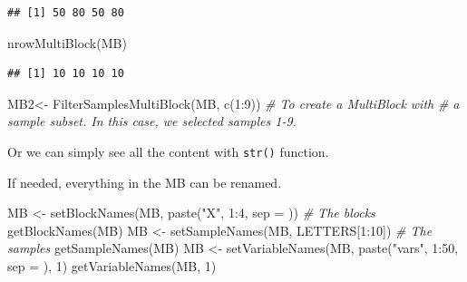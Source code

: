 \documentclass[
]{book}
\newenvironment{Shaded}{\begin{snugshade}}{\end{snugshade}}
\newcommand{\AttributeTok}[1]{\textcolor[rgb]{0.77,0.63,0.00}{#1}}
\newcommand{\CommentTok}[1]{\textcolor[rgb]{0.56,0.35,0.01}{\textit{#1}}}
\newcommand{\DecValTok}[1]{\textcolor[rgb]{0.00,0.00,0.81}{#1}}
\newcommand{\FunctionTok}[1]{\textcolor[rgb]{0.00,0.00,0.00}{#1}}
\newcommand{\NormalTok}[1]{#1}
\newcommand{\OtherTok}[1]{\textcolor[rgb]{0.56,0.35,0.01}{#1}}
\newcommand{\SpecialCharTok}[1]{\textcolor[rgb]{0.00,0.00,0.00}{#1}}
\newcommand{\StringTok}[1]{\textcolor[rgb]{0.31,0.60,0.02}{#1}}
\begin{document}
\begin{verbatim}
## [1] 50 80 50 80
\end{verbatim}

\begin{Shaded}
\begin{Highlighting}[]
\FunctionTok{nrowMultiBlock}\NormalTok{(MB)}
\end{Highlighting}
\end{Shaded}

\begin{verbatim}
## [1] 10 10 10 10
\end{verbatim}

\begin{Shaded}
\begin{Highlighting}[]
\NormalTok{MB2}\OtherTok{\textless{}{-}} \FunctionTok{FilterSamplesMultiBlock}\NormalTok{(MB, }\FunctionTok{c}\NormalTok{(}\DecValTok{1}\SpecialCharTok{:}\DecValTok{9}\NormalTok{)) }\CommentTok{\# To create a MultiBlock with }
 \CommentTok{\# a sample subset. In this case, we selected samples 1{-}9.}
\end{Highlighting}
\end{Shaded}

Or we can simply see all the content with \texttt{str()} function.

If needed, everything in the MB can be renamed.

\begin{Shaded}
\begin{Highlighting}[]
\NormalTok{MB }\OtherTok{\textless{}{-}} \FunctionTok{setBlockNames}\NormalTok{(MB, }\FunctionTok{paste}\NormalTok{(}\StringTok{"X"}\NormalTok{, }\DecValTok{1}\SpecialCharTok{:}\DecValTok{4}\NormalTok{, }\AttributeTok{sep =} \StringTok{\textquotesingle{}\textquotesingle{}}\NormalTok{)) }\CommentTok{\# The blocks}
\FunctionTok{getBlockNames}\NormalTok{(MB)}
\NormalTok{MB }\OtherTok{\textless{}{-}} \FunctionTok{setSampleNames}\NormalTok{(MB, LETTERS[}\DecValTok{1}\SpecialCharTok{:}\DecValTok{10}\NormalTok{]) }\CommentTok{\# The samples}
\FunctionTok{getSampleNames}\NormalTok{(MB)}
\NormalTok{MB }\OtherTok{\textless{}{-}} \FunctionTok{setVariableNames}\NormalTok{(MB, }\FunctionTok{paste}\NormalTok{(}\StringTok{"vars"}\NormalTok{, }\DecValTok{1}\SpecialCharTok{:}\DecValTok{50}\NormalTok{, }\AttributeTok{sep =} \StringTok{\textquotesingle{}\textquotesingle{}}\NormalTok{), }\DecValTok{1}\NormalTok{)}
\FunctionTok{getVariableNames}\NormalTok{(MB, }\DecValTok{1}\NormalTok{)}
\end{Highlighting}
\end{Shaded}
\end{document}
